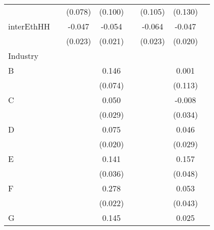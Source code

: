 {\begin{longtable}{l*{3}{c}|l*{3}{c}}
		&                     &     (0.078)         &     (0.100)         &                     &     (0.105)         &     (0.130)         \\
		interEthHH        &                     &      -0.047\sym{*}  &      -0.054\sym{*}  &                     &      -0.064\sym{**} &      -0.047\sym{*}  \\
		&                     &     (0.023)         &     (0.021)         &                     &     (0.023)         &     (0.020)         \\
		Industry &&&&&\\
		B                   &                     &                     &       0.146\sym{*}  &                     &                     &       0.001         \\
		&                     &                     &     (0.074)         &                     &                     &     (0.113)         \\
		C                   &                     &                     &       0.050         &                     &                     &      -0.008         \\
		&                     &                     &     (0.029)         &                     &                     &     (0.034)         \\
		D                   &                     &                     &       0.075\sym{***}&                     &                     &       0.046         \\
		&                     &                     &     (0.020)         &                     &                     &     (0.029)         \\
		E                   &                     &                     &       0.141\sym{***}&                     &                     &       0.157\sym{**} \\
		&                     &                     &     (0.036)         &                     &                     &     (0.048)         \\
		F                   &                     &                     &       0.278\sym{***}&                     &                     &       0.053         \\
		&                     &                     &     (0.022)         &                     &                     &     (0.043)         \\
		G                   &                     &                     &       0.145\sym{***}&                     &                     &       0.025         \\

\end{longtable}}

